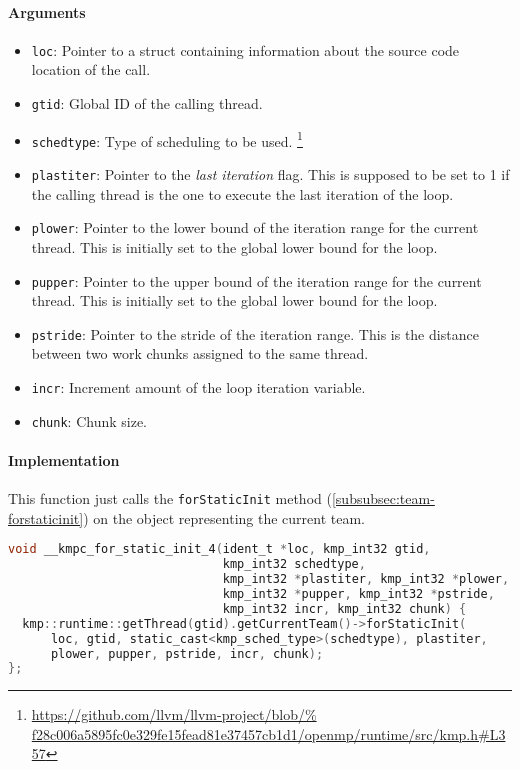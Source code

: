 \paragraph{Arguments}
\begin{itemize}
	\item \texttt{loc}: Pointer to a struct containing information about the source code location
	      of the call.
	\item \texttt{gtid}: Global ID of the calling thread.
	\item \texttt{schedtype}: Type of scheduling to be used.
	      \footnote{\url{
			      https://github.com/llvm/llvm-project/blob/%
			      f28c006a5895fc0e329fe15fead81e37457cb1d1/openmp/runtime/src/kmp.h\#L357}}
	\item \texttt{plastiter}: Pointer to the \emph{last iteration} flag. This is supposed to be set
	      to 1 if the calling thread is the one to execute the last iteration of the loop.
	\item \texttt{plower}: Pointer to the lower bound of the iteration range for the current thread.
	      This is initially set to the global lower bound for the loop.
	\item \texttt{pupper}: Pointer to the upper bound of the iteration range for the current thread.
	      This is initially set to the global lower bound for the loop.
	\item \texttt{pstride}: Pointer to the stride of the iteration range. This is the distance between
	      two work chunks assigned to the same thread.
	\item \texttt{incr}: Increment amount of the loop iteration variable.
	\item \texttt{chunk}: Chunk size.
\end{itemize}

\paragraph{Implementation} This function just calls the \texttt{forStaticInit} method
(\cref{subsubsec:team-forstaticinit}) on the object representing the current team.

\begin{lstlisting}[language=C, caption={\_\_kmpc\_for\_static\_init\_4}, label={lst:for-static-init-4},
                   escapechar=@]
void __kmpc_for_static_init_4(ident_t *loc, kmp_int32 gtid,
                              kmp_int32 schedtype,
                              kmp_int32 *plastiter, kmp_int32 *plower,
                              kmp_int32 *pupper, kmp_int32 *pstride,
                              kmp_int32 incr, kmp_int32 chunk) {
  kmp::runtime::getThread(gtid).getCurrentTeam()->forStaticInit(
      loc, gtid, static_cast<kmp_sched_type>(schedtype), plastiter,
      plower, pupper, pstride, incr, chunk);
};
\end{lstlisting}

